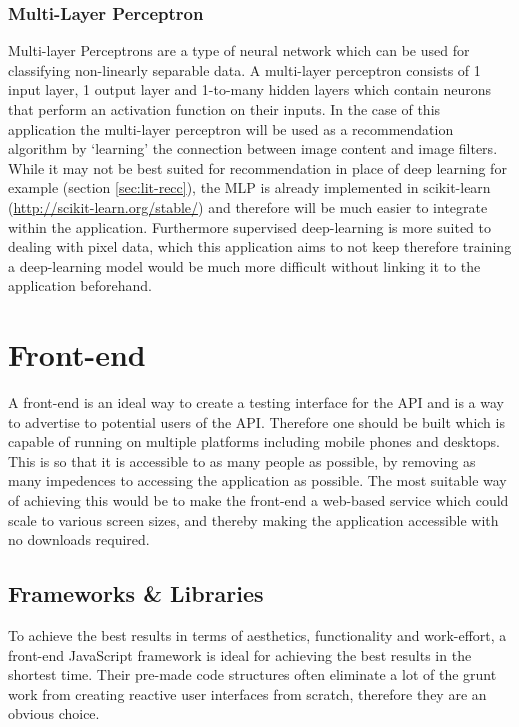 \documentclass[a4paper,12pt]{report}
\begin{document}
        \subsubsection{Multi-Layer Perceptron} \label{sec:mlp}
          Multi-layer Perceptrons \citep{minsky2017perceptrons} are a type of neural network which can be used for classifying non-linearly separable data. A multi-layer perceptron consists of 1 input layer, 1 output layer and 1-to-many hidden layers which contain neurons that perform an activation function on their inputs. In the case of this application the multi-layer perceptron will be used as a recommendation algorithm by ‘learning’ the connection between image content and image filters. While it may not be best suited for recommendation in place of deep learning for example (section \ref{sec:lit-recc}), the MLP is already implemented in scikit-learn (\url{http://scikit-learn.org/stable/}) and therefore will be much easier to integrate within the application. Furthermore supervised deep-learning is more suited to dealing with pixel data, which this application aims to not keep therefore training a deep-learning model would be much more difficult without linking it to the application beforehand.

    \section{Front-end}
      A front-end is an ideal way to create a testing interface for the API and is a way to advertise to potential users of the API. Therefore one should be built which is capable of running on multiple platforms including mobile phones and desktops. This is so that it is accessible to as many people as possible, by removing as many impedences to accessing the application as possible. The most suitable way of achieving this would be to make the front-end a web-based service which could scale to various screen sizes, and thereby making the application accessible with no downloads required.

      \subsection{Frameworks \& Libraries} %
        To achieve the best results in terms of aesthetics, functionality and work-effort, a front-end JavaScript framework is ideal for achieving the best results in the shortest time. Their pre-made code structures often eliminate a lot of the grunt work from creating reactive user interfaces from scratch, therefore they are an obvious choice.
\end{document}
